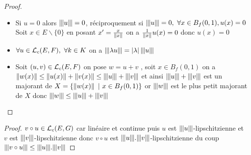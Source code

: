 		\trait 
		
		\begin{proof} ~
		\begin{itemize}
			\item Si $u=0$ alors $\normop{u} = 0$, réciproquement si $\normop{u} = 0 ,~\forall x\in B_f(0,1), u(x) = 0$ Soit $x\in E\backslash \{0\}$ en posant $x' = \frac{x}{\norm{x}}$  on a $\frac{1}{\norm{x}}u(x) = 0$ donc $u(x)=0$
			\item $\forall u\in \lin_c (E,F) ,~\forall k\in K$ on a $\normop{\lambda u} = \abs{\lambda }\normop{u}$
			\item Soit $(u,v) \in \lin_c (E,F)$ on pose $w=u+v$ , soit $x\in B_f(0,1)$ on a  $\norm{w(x)} \leq \norm{u(x)} + \norm{v(x)} \leq \normop{u} + \normop{v}$ et ainsi $\normop{u} + \normop{v}$ est un majorant de  $X=\{\norm{w(x)} ~|~x\in B_f(0,1) \}$ or $\normop{w}$ est le plus petit majorant de $X$ donc $\normop{w} \leq \normop{u}+\normop{v}$
		\end{itemize}
		\end{proof} \medskip
		
		
		 \medskip
		
		
		\begin{proof}
		$v\circ u \in \lin_c (E,G)$ car linéaire et continue puis $u$ est $\normop{u}$-lipschitzienne et \\ 
		$v$ est $\normop{v}$-lipschitzienne donc $v\circ u$ est $\normop{u}.\normop{v}$-lipschitzienne du coup $\normop{v\circ u} \leq \normop{u} . \normop{v}$
		\end{proof}
		
